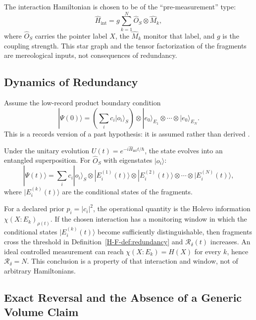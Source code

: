 \documentclass[12pt,a4paper,openany]{book}
\begin{document}
The interaction Hamiltonian is chosen to be of the ``pre-measurement'' type:
\begin{equation}
\hat{H}_{\text{int}} = g \sum_{k=1}^{N} \hat{O}_S \otimes \hat{M}_k,
\end{equation}
where $\hat{O}_S$ carries the pointer label $X$, the $\hat{M}_k$ monitor that label, and $g$ is the coupling strength.  This star graph and the tensor factorization of the fragments are mereological inputs, not consequences of redundancy.

\subsection{Dynamics of Redundancy}

Assume the low-record product boundary condition
\begin{equation}
|\Psi(0)\rangle = \left(\sum_i c_i|o_i\rangle_S\right)
\otimes |e_0\rangle_{E_1}\otimes\cdots\otimes|e_0\rangle_{E_N}.
\end{equation}
This is a records version of a past hypothesis: it is assumed rather than derived \cite{Albert2000,Wallace2010}.

Under the unitary evolution $U(t) = e^{-i\hat{H}_{\text{int}}t/\hbar}$, the state evolves into an entangled superposition. For $\hat{O}_S$ with eigenstates $|o_i\rangle$:
\begin{equation}
|\Psi(t)\rangle = \sum_i c_i |o_i\rangle_S \otimes |E_i^{(1)}(t)\rangle \otimes |E_i^{(2)}(t)\rangle \otimes \cdots \otimes |E_i^{(N)}(t)\rangle,
\end{equation}
where $|E_i^{(k)}(t)\rangle$ are the conditional states of the fragments.

For a declared prior $p_i=|c_i|^2$, the operational quantity is the Holevo information $\chi(X:E_k)_{\rho(t)}$.  If the chosen interaction has a monitoring window in which the conditional states $|E_i^{(k)}(t)\rangle$ become sufficiently distinguishable, then fragments cross the threshold in Definition~\ref{H-F-def:redundancy} and $\mathcal R_\delta(t)$ increases.  An ideal controlled measurement can reach $\chi(X:E_k)=H(X)$ for every $k$, hence $\mathcal R_\delta=N$.  This conclusion is a property of that interaction and window, not of arbitrary Hamiltonians.

\subsection{Exact Reversal and the Absence of a Generic Volume Claim}
\end{document}
